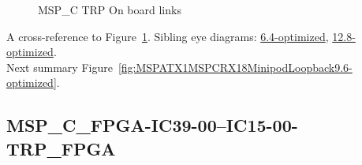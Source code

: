 \begin{figure}[h]
\begin{subfigure}{0.25\textwidth}
\hyperref[sec:MSPCFPGAIC3924IC1524TRPFPGA9.6-optimized]{}
\end{subfigure}\hspace*{\fill}
\begin{subfigure}{0.25\textwidth}
\hyperref[sec:MSPCFPGAIC3925IC1525TRPFPGA9.6-optimized]{}
\end{subfigure}\hspace*{\fill}
\begin{subfigure}{0.25\textwidth}
\hyperref[sec:MSPCFPGAIC3926IC1526TRPFPGA9.6-optimized]{}
\end{subfigure}\hspace*{\fill}
\begin{subfigure}{0.25\textwidth}
\hyperref[sec:MSPCFPGAIC3927IC1527TRPFPGA9.6-optimized]{}
\end{subfigure}

\caption{MSP\_C TRP On board links} \label{fig:MSPCTRPOnboardlinks9.6-optimized}
\end{figure}

A cross-reference to Figure~\ref{fig:MSPCTRPOnboardlinks9.6-optimized}.
Sibling eye diagrams: \hyperref[sec:MSPCTRPOnboardlinks6.4-optimized]{6.4-optimized}, \hyperref[sec:MSPCTRPOnboardlinks12.8-optimized]{12.8-optimized}. \\
Next summary Figure~\ref{fig:MSPATX1MSPCRX18MinipodLoopback9.6-optimized}.
\clearpage
% 
\subsection{MSP\_C\_FPGA-IC39-00--IC15-00-TRP\_FPGA}\label{sec:MSPCFPGAIC3900IC1500TRPFPGA9.6-optimized}

